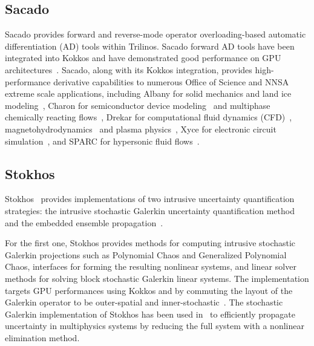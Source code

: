 \subsection{Sacado}

Sacado \cite{SacadoURL,phipps2012efficient,phipps2008large} provides forward and reverse-mode operator overloading-based automatic differentiation (AD) tools within Trilinos.
Sacado forward AD tools have been integrated into Kokkos and have demonstrated good performance on GPU architectures~\cite{phipps2022automatic}.
Sacado, along with its Kokkos integration, provides high-performance derivative capabilities to numerous Office of Science and NNSA extreme scale applications, including Albany for solid mechanics and land ice modeling~\cite{Salinger2016,MPASAlbany2018}, 
Charon for semiconductor device modeling~\cite{CharonUsersManual2020} and multiphase chemically reacting flows~\cite{Musson2009}, Drekar for computational fluid dynamics (CFD)~\cite{Sondak2021,Shadid2016}, magnetohydrodynamics~\cite{Shadid2016mhd} and 
plasma physics~\cite{Crockatt2022,Miller2019}, Xyce for electronic circuit simulation~\cite{xyceTrilinos,xycePCE}, and SPARC for hypersonic fluid flows~\cite{SparcValidation}. 

\subsection{Stokhos}

Stokhos~\cite{phipps2015stokhos,Phipps2016,phipps2014exploring} provides implementations of two intrusive uncertainty quantification strategies: 
the intrusive stochastic Galerkin uncertainty quantification method~\cite{ghanem1990polynomial,ghanem2003stochastic} and the embedded ensemble propagation~\cite{phipps2017embedded}.

For the first one, Stokhos provides methods for computing intrusive stochastic Galerkin projections such as Polynomial Chaos and Generalized Polynomial Chaos, 
interfaces for forming the resulting nonlinear systems, and linear solver methods for solving block stochastic Galerkin linear systems.
The implementation targets GPU performances using Kokkos and by commuting the layout of the Galerkin operator to be outer-spatial and inner-stochastic~\cite{phipps2014exploring}.
The stochastic Galerkin implementation of Stokhos has been used in~\cite{constantine2014efficient} to efficiently propagate uncertainty in multiphysics systems by reducing the full system with a nonlinear elimination method.

